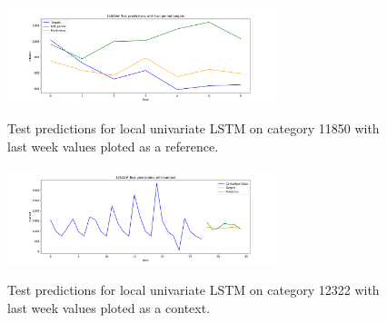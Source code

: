 
\begin{figure}
  \centering
  \caption{Test predictions for local univariate LSTM on category 11850 with last week values ploted as a reference.}
  \includegraphics[width=0.7\textwidth]{./figs/results/predictions/11850_Test_predictions_with_last_period_targets.png}
  \hfill
  \label{fig:results:predictions:11850-Test_predictions_with_last_period_targets.png}
\end{figure}

\begin{figure}
  \centering
  \caption{Test predictions for local univariate LSTM on category 12322 with last week values ploted as a context.}
  \includegraphics[width=0.7\textwidth]{./figs/results/predictions/12322_Test_predictions_with_context.png}
  \hfill
  \label{fig:results:predictions:12322-Test_predictions_with_last_period_context.png}
\end{figure}



